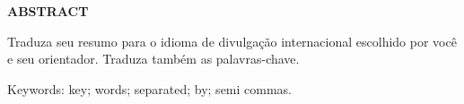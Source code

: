 \newpage
\thispagestyle{empty}
\begin{center}
	\textbf{\MakeUppercase{Abstract}}
\end{center}

\noindent
Traduza seu resumo para o idioma de
divulgação internacional escolhido por você e seu orientador. Traduza também as palavras-chave.

\vspace{1em}
\noindent
Keywords: key; words; separated; by; semi commas.